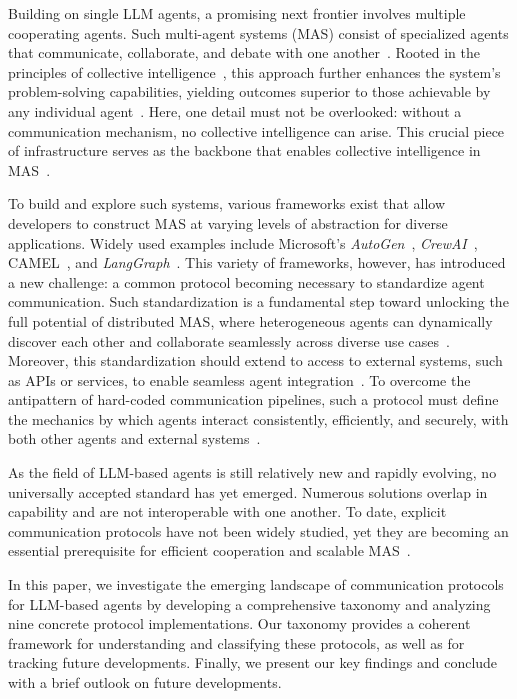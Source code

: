 \documentclass[pdflatex,sn-mathphys-num]{sn-jnl}%
\theoremstyle{thmstyleone}%
\theoremstyle{thmstyletwo}%
\theoremstyle{thmstylethree}%
\begin{document}
Building on single LLM agents, a promising next frontier involves multiple cooperating agents. Such multi-agent systems (MAS) consist of specialized agents that communicate, collaborate, and debate with one another~\cite{guo2024large,talebirad2023multi}. Rooted in the principles of collective intelligence~\cite{malone2015handbook}, this approach further enhances the system's problem-solving capabilities, yielding outcomes superior to those achievable by any individual agent~\cite{guo2024large,chen2024agentverse,hong2024metagpt}. Here, one detail must not be overlooked: without a communication mechanism, no collective intelligence can arise. This crucial piece of infrastructure serves as the backbone that enables collective intelligence in MAS~\cite{guo2024large,han2024llm,yan2025beyond}.

To build and explore such systems, various frameworks exist that allow developers to construct MAS at varying levels of abstraction for diverse applications. Widely used examples include Microsoft's \textit{AutoGen}~\cite{autogengit,wu2024autogen}, \textit{CrewAI}~\cite{crewaigit}, CAMEL~\cite{camelgit,li2023camelcommunicativeagentsmind}, and \textit{LangGraph}~\cite{langgraphgit}. This variety of frameworks, however, has introduced a new challenge: a common protocol becoming necessary to standardize agent communication. Such standardization is a fundamental step toward unlocking the full potential of distributed MAS, where heterogeneous agents can dynamically discover each other and collaborate seamlessly across diverse use cases~\cite{cemri2025multi,yan2025beyond,kong2025survey}. 
Moreover, this standardization should extend to access to external systems, such as APIs or services, to enable seamless agent integration~\cite{ehtesham2025survey}. To overcome the antipattern of hard-coded communication pipelines, such a protocol must define the mechanics by which agents interact consistently, efficiently, and securely, with both other agents and external systems~\cite{marro2024scalable,li2025llm,kong2025survey,yan2025beyond}.

As the field of LLM-based agents is still relatively new and rapidly evolving, no universally accepted standard has yet emerged. Numerous solutions overlap in capability and are not interoperable with one another. To date, explicit communication protocols have not been widely studied, yet they are becoming an essential prerequisite for efficient cooperation and scalable MAS~\cite{yan2025beyond,li2025llm,kong2025survey}.

In this paper, we investigate the emerging landscape of communication protocols for LLM-based agents by developing a comprehensive taxonomy and analyzing nine concrete protocol implementations. Our taxonomy provides a coherent framework for understanding and classifying these protocols, as well as for tracking future developments. Finally, we present our key findings and conclude with a brief outlook on future developments.
\end{document}
